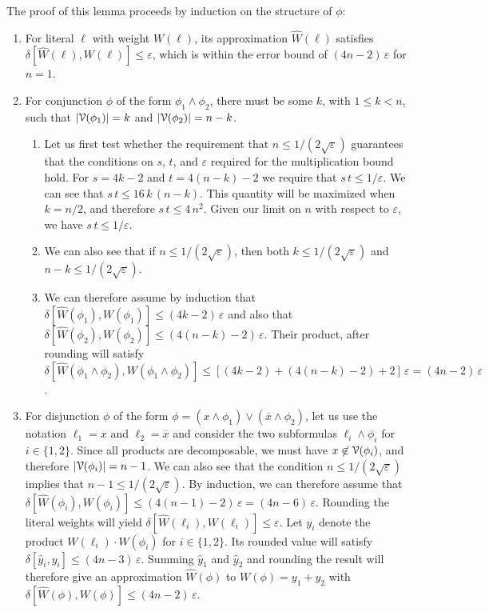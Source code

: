 \documentclass[letterpaper,USenglish,cleveref, autoref, thm-restate]{lipics-v2021}
\newcommand{\obar}[1]{\overline{#1}}
\newcommand{\lit}{\ell}
\newcommand{\approximate}[1]{\hat{#1}}
\newcommand{\approxy}{\approximate{y}}
\newcommand{\approxW}{\approximate{W}}
\newcommand{\aerror}{\delta}
\newcommand{\roundepsilon}{\varepsilon}
\newcommand{\dependencyset}{{\cal V}}
\begin{document}
The proof of this lemma proceeds by induction on the structure of $\phi$:
\begin{enumerate}
\item For literal $\lit$ with weight $W(\lit)$, its approximation $\approxW(\lit)$ satisfies
$\aerror[\approxW(\lit), W(\lit)] \leq \roundepsilon$, which is within the error bound of $(4n-2)\,\roundepsilon$ for $n=1$.
\item For conjunction $\phi$ of the form $\phi_1 \land \phi_2$, there must be some $k$, with $1 \leq k < n$, such that $|\dependencyset(\phi_1)| = k$
  and $|\dependencyset(\phi_2)| = n-k$.
\begin{enumerate}
\item Let us first test whether the requirement that $n \leq 1/(2\sqrt{\roundepsilon})$ 
  guarantees that the conditions on $s$, $t$, and $\roundepsilon$ required for the multiplication bound  hold.
For $s = 4k-2$ and $t = 4(n-k)-2$
    we require that $s\,t \leq 1/\roundepsilon$.  We can see that $s\,t \leq 16\,k\,(n-k)$. This quantity will be maximized when $k = n/2$,
    and therefore $s \, t \leq 4\,n^2$.
    Given our limit on $n$ with respect to $\roundepsilon$, we have $s \, t \leq 1/\roundepsilon$.
  \item
    We can also see that if $n \leq 1/(2\sqrt{\roundepsilon})$, then both
    $k \leq 1/(2\sqrt{\roundepsilon})$ and  $n-k \leq 1/(2\sqrt{\roundepsilon})$.
  \item
We can therefore assume by induction that 
 $\aerror[\approxW(\phi_1), W(\phi_1)] \leq (4 k-2) \,\roundepsilon$
  and also that $\aerror[\approxW(\phi_2), W(\phi_2)] \leq (4 (n-k)-2) \,\roundepsilon$.  Their product, after rounding
  will satisfy 
$\aerror[\approxW(\phi_1 \land \phi_2), W(\phi_1 \land \phi_2)] \leq [(4 k -2) + (4 (n-k) -2) + 2]\,\roundepsilon = (4n-2) \,\roundepsilon$.
\end{enumerate}
\item For disjunction $\phi$ of the form
  $\phi = (x \land \phi_1) \lor (\obar{x} \land \phi_2)$, let us use the notation $\lit_1 = x$ and $\lit_2 = \obar{x}$
  and consider the two subformulas $\lit_i \land \phi_i$ for $i \in \{1,2\}$.
  Since all products are decomposable, we must have $x \not \in \dependencyset(\phi_i)$,
  and therefore $|\dependencyset(\phi_i)| = n-1$.  We can also see that the condition 
  $n \leq 1/(2\sqrt{\roundepsilon})$ implies that   $n-1 \leq 1/(2\sqrt{\roundepsilon})$.
  By induction, we can therefore assume that
  $\aerror[\approxW(\phi_i), W(\phi_i)] \leq (4(n-1)-2) \,\roundepsilon = (4n-6)\,\roundepsilon$.  Rounding the literal weights will yield
  $\aerror[\approxW(\lit_i), W(\lit_i)] \leq \roundepsilon$.  Let $y_i$ denote the product $W(\lit_i) \cdot W(\phi_i)$ for $i \in \{1,2\}$.
  Its rounded value will satisfy
  $\aerror[\approxy_i, y_i] \leq (4n-3) \,\roundepsilon$.  Summing $\approxy_1$ and $\approxy_2$ and rounding the result will therefore give
  an approximation $\approxW(\phi)$ to $W(\phi) = y_1 + y_2$ with
$\aerror[\approxW(\phi), W(\phi)] \leq (4n-2)\,\roundepsilon$.  
\end{enumerate}
\end{document}
